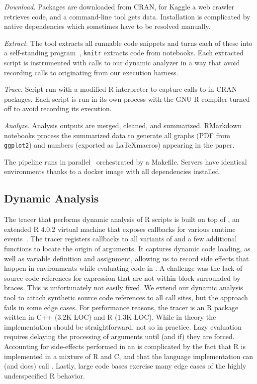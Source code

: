 \documentclass[review,screen,acmsmall]{acmart}%
\renewcommand{\k}[1]{\lstinline |#1|\xspace}
\begin{document}
\begin{compactenum}[(1)]
\item \emph{Download.} Packages are downloaded from CRAN, for Kaggle a web
  crawler retrieves code, and a command-line tool gets data. Installation is
  complicated by native dependencies which sometimes have to be resolved
  manually.
\item \emph{Extract.} The \genthat tool extracts all runnable code snippets and
  turns each of these into a self-standing program~\cite{issta18}, \k{knitr}
  extracts code from notebooks. Each extracted script is instrumented with calls
  to our dynamic analyzer in a way that avoid recording calls to \eval
  originating from our execution harness.
\item \emph{Trace.} Script run with a modified R interpreter to capture calls
  to \eval in CRAN packages. Each script is run in its own process with the GNU
  R compiler turned off to avoid recording its execution.
\item \emph{Analyze.} Analysis outputs are merged, cleaned, and summarized.
  RMarkdown notebooks process the summarized data to generate all graphs (PDF
  from \k{ggplot2}) and numbers (exported as \LaTeX macros) appearing in the
  paper.
\end{compactenum}

\medskip The pipeline runs in parallel~\cite{GNUparallel} orchestrated by a
Makefile. Servers have identical environments thanks to a docker image with all
dependencies installed.

\subsection{Dynamic Analysis}

The tracer that performs dynamic analysis of R scripts is built on top of
\rdyntrace, an extended R 4.0.2 virtual machine that exposes callbacks for
various runtime events~\cite{oopsla19b}. The tracer registers callbacks to all
variants of \eval and a few additional functions to locate the origin of \eval
arguments. It captures dynamic code loading, as well as variable definition and
assignment, allowing us to record side effects that happen in environments
while evaluating code in \eval. A challenge was the lack of source code
references for expression that are not within block surrounded by braces. This
is unfortunately not easily fixed. We extend our dynamic analysis tool to
attach synthetic source code references to all \eval call sites, but the
approach fails in some edge cases. For performance reasons, the tracer is an R
package written in C++ (3.2K LOC) and R (1.3K LOC). While in theory the
implementation should be straightforward, not so in practice. Lazy evaluation
requires delaying the processing of arguments until (and if) they are forced.
Accounting for side-effects performed in an \eval is complicated by the fact
that R is implemented in a mixture of R and C, and that the language
implementation can (and does) call \eval. Lastly, large code bases exercise
many edge cases of the highly underspecified R behavior.
\end{document}
